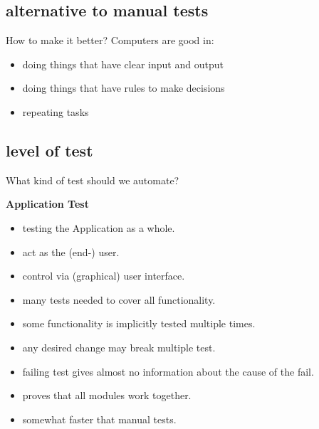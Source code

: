 \documentclass[SoftwareQuality.tex]{subfiles}
\begin{document}
\subsection*{alternative to manual tests}
\begin{frame}{How to make it better?} 
Computers are good in:
\begin{itemize}
	\item  doing things that have clear input and output
	\item  doing things that have rules to make decisions
	\item  repeating tasks
\end{itemize}
\vfill

\vfill

\end{frame}

\subsection*{level of test}
\begin{frame}{What kind of test should we automate?} 

\textbf{Application Test}
\begin{itemize}
\item testing the Application as a whole.
\item act as the (end-) user.
\item control via (graphical) user interface.
\item many tests needed to cover all functionality.
\item some functionality is implicitly tested multiple times.
\item any desired change may break multiple test.
\item failing test gives almost no information about the cause of the fail.
\item proves that all modules work together.
\item somewhat faster that manual tests.
\end{itemize}

\end{frame}
\end{document}
